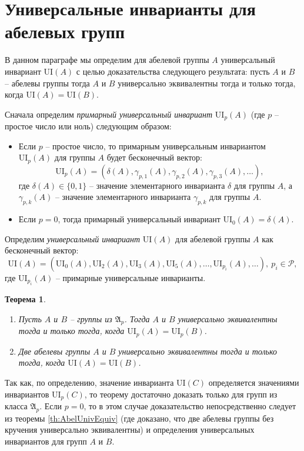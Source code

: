 \documentclass[a4paper,11pt,twoside]{article}
\newtheorem{theorem}{Теорема}[section]
\def\proof{{\noindent{\bf Доказательство.}} }
\def\A{{\mathfrak{A}}}
\def\P{{\mathcal{P}}}
\def\ui{{\mathrm{UI}}}
\begin{document}
\section{Универсальные инварианты для абелевых групп}

В данном параграфе мы определим для абелевой группы $A$ универсальный инвариант $\ui(A)$ с целью доказательства следующего результата: пусть $A$ и $B$ -- абелевы группы тогда $A$ и $B$ универсально эквивалентны тогда и только тогда, когда $\ui(A) = \ui(B)$.

Сначала определим \textit{примарный универсальный инвариант} $\ui_p(A)$ (где $p$ -- простое число или ноль) следующим образом: 
\begin{itemize}
\item Если $p$ -- простое число, то примарным универсальным инвариантом $\ui_p(A)$ для группы $A$ будет бесконечный вектор:
$$\ui_p(A) = (\delta(A), \gamma_{p,1}(A), \gamma_{p,2}(A), \gamma_{p,3}(A), \ldots),$$
где $\delta(A) \in \{0,1\}$ -- значение элементарного инварианта $\delta$ для группы $A$, а $\gamma_{p,k}(A)$ -- значение элементарного инварианта $\gamma_{p,k}$ для группы $A$.
\item Если $p = 0$, тогда примарный универсальный инвариант $\ui_0(A) = \delta(A)$.
\end{itemize}

Определим \textit{универсальный инвариант} $\ui(A)$ для абелевой группы $A$ как бесконечный вектор:
$$\ui(A) = (\ui_{0}(A), \ui_{2}(A), \ui_{3}(A),\ui_{5}(A),\ldots, \ui_{p_i}(A), \ldots), \ p_i \in \P,$$
где $\ui_{p_i}(A)$ -- примарные универсальные инварианты.


\begin{theorem}\label{th:UnivEquivOfGroups}
\begin{enumerate}
\item Пусть $A$ и $B$ -- группы из $\A_p$. Тогда $A$ и $B$ универсально эквивалентны тогда и только тогда, когда $\ui_p(A) = \ui_p(B)$.
\item Две абелевы группы $A$ и $B$ универсально эквивалентны тогда и только тогда, когда $\ui(A) = \ui(B)$.
\end{enumerate}
\end{theorem}


\proof Так как, по определению, значение инварианта $\ui(C)$ определяется значениями инвариантов $\ui_p(C)$, то теорему достаточно доказать только для групп из класса $\A_p$. Если $p=0$, то в этом случае доказательство непосредственно следует из теоремы \ref{th:AbelUnivEquiv} (где доказано, что две абелевы группы без кручения универсально эквивалентны) и определения универсальных инвариантов для групп $A$ и $B$.
\end{document}
